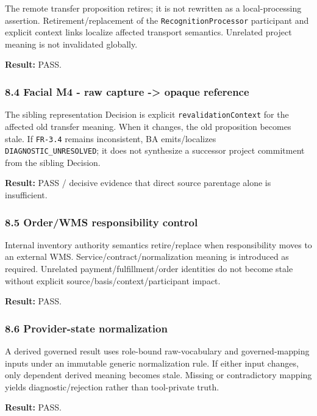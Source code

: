 \documentclass[11pt,a4paper]{article}
\begin{document}
The remote transfer proposition retires; it is not rewritten as a local-processing assertion. Retirement/replacement of the \texttt{RecognitionProcessor} participant and explicit context links localize affected transport semantics. Unrelated project meaning is not invalidated globally.

\textbf{Result:} PASS.

\subsubsection{8.4 Facial M4 - raw capture -\textgreater{} opaque reference}\label{facial-m4---raw-capture---opaque-reference}

The sibling representation Decision is explicit \texttt{revalidationContext} for the affected old transfer meaning. When it changes, the old proposition becomes stale. If \texttt{FR-3.4} remains inconsistent, BA emits/localizes \texttt{DIAGNOSTIC\_UNRESOLVED}; it does not synthesize a successor project commitment from the sibling Decision.

\textbf{Result:} PASS / decisive evidence that direct source parentage alone is insufficient.

\subsubsection{8.5 Order/WMS responsibility control}\label{orderwms-responsibility-control}

Internal inventory authority semantics retire/replace when responsibility moves to an external WMS. Service/contract/normalization meaning is introduced as required. Unrelated payment/fulfillment/order identities do not become stale without explicit source/basis/context/participant impact.

\textbf{Result:} PASS.

\subsubsection{8.6 Provider-state normalization}\label{provider-state-normalization}

A derived governed result uses role-bound raw-vocabulary and governed-mapping inputs under an immutable generic normalization rule. If either input changes, only dependent derived meaning becomes stale. Missing or contradictory mapping yields diagnostic/rejection rather than tool-private truth.

\textbf{Result:} PASS.
\end{document}
